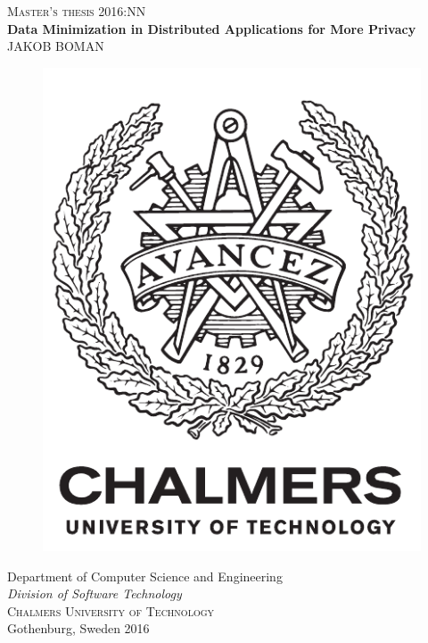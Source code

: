 \newpage
\thispagestyle{empty}
\begin{center}
	\textsc{\large Master's thesis 2016:NN}\\[4cm]		%
	\textbf{\Large Data Minimization in Distributed Applications for More Privacy} \\[1cm]
	{\large JAKOB BOMAN}
	
	\vfill	
	\begin{figure}[H]
	\centering
	\includegraphics[width=0.2\pdfpagewidth]{include/frontpage/logo_eng.pdf} \\	
	\end{figure}	\vspace{5mm}	
	
	Department of Computer Science and Engineering \\
	\emph{Division of Software Technology}\\
	\textsc{Chalmers University of Technology} \\
	Gothenburg, Sweden 2016 \\
\end{center}


